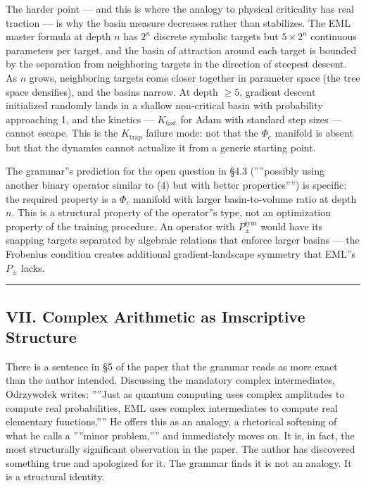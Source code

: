 \documentclass[12pt,a4paper]{article}
\newcommand{\pilcrow}{\S}
\begin{document}
The harder point --- and this is where the analogy to physical criticality has real
traction --- is why the basin measure decreases rather than stabilizes. The EML
master formula at depth $n$ has $2^n$ discrete symbolic targets but $5 \times
2^n$ continuous parameters per target, and the basin of attraction around each
target is bounded by the separation from neighboring targets in the direction of
steepest descent. As $n$ grows, neighboring targets come closer together in
parameter space (the tree space densifies), and the basins narrow. At depth $\geq 5$,
gradient descent initialized randomly lands in a shallow non-critical basin with
probability approaching 1, and the kinetics --- $K_\text{fast}$ for Adam with
standard step sizes --- cannot escape. This is the $K_\text{trap}$ failure mode:
not that the $\Phi_c$ manifold is absent but that the dynamics cannot actualize
it from a generic starting point.

The grammar''s prediction for the open question in \pilcrow{}4.3 (''''possibly using another
binary operator similar to (4) but with better properties'''') is specific: the
required property is a $\Phi_c$ manifold with larger basin-to-volume ratio at
depth $n$. This is a structural property of the operator''s type, not an
optimization property of the training procedure. An operator with
$P_{\pm}^{\text{sym}}$ would have its snapping targets separated by algebraic
relations that enforce larger basins --- the Frobenius condition creates additional
gradient-landscape symmetry that EML''s $P_{\pm}$ lacks.

\begin{center}
\rule{0.5\textwidth}{0.4pt}
\end{center}

\subsection{VII. Complex Arithmetic as Imscriptive Structure}

There is a sentence in \pilcrow{}5 of the paper that the grammar reads as more exact than
the author intended. Discussing the mandatory complex intermediates, Odrzywołek
writes: ''''Just as quantum computing uses complex amplitudes to compute real
probabilities, EML uses complex intermediates to compute real elementary
functions.'''' He offers this as an analogy, a rhetorical softening of what he calls
a ''''minor problem,'''' and immediately moves on. It is, in fact, the most
structurally significant observation in the paper. The author has discovered
something true and apologized for it. The grammar finds it is not an analogy.
It is a structural identity.
\end{document}
